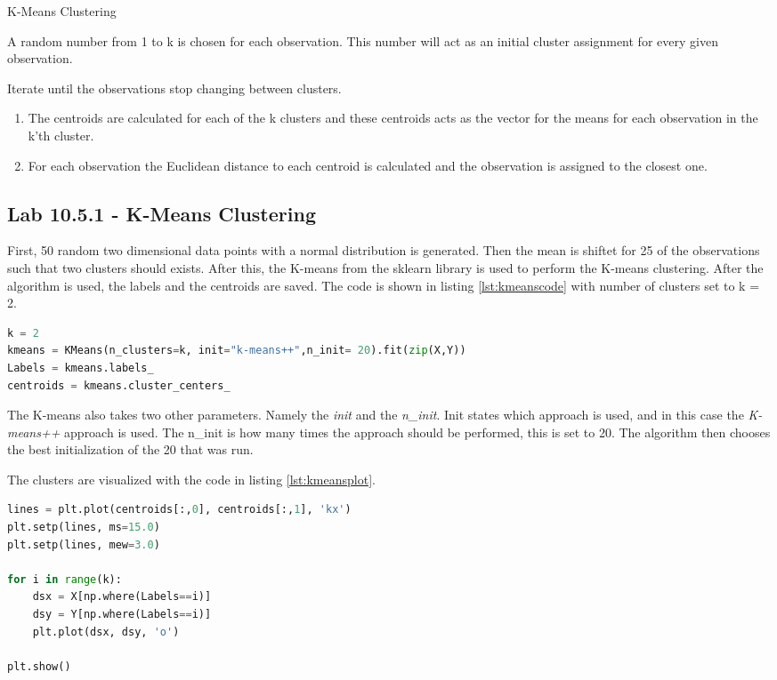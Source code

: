 \begin{algorithm}
	\caption{K-Means Clustering}
	\label{algo:KMeansClustering}
	\begin{algorithmic}[1]
		\State A random number from 1 to k is chosen for each observation. This number will act as an initial cluster assignment for every given observation.
		
		\State 
		Iterate until the observations stop changing between clusters.
		\begin{enumerate}[label=(\alph*)]
			\item The centroids are calculated for each of the k clusters and these centroids acts as the vector for the means for each observation in the k'th cluster.
			
			\item For each observation the Euclidean distance to each centroid is calculated and the observation is assigned to the closest one.
		\end{enumerate}
	\end{algorithmic}
\end{algorithm}

\subsection{Lab 10.5.1 - K-Means Clustering}
First, 50 random two dimensional data points with a normal distribution is generated. Then the mean is shiftet for 25 of the observations such that two clusters should exists. After this, the K-means from the sklearn library is used to perform the K-means clustering.
After the algorithm is used, the labels and the centroids are saved. The code is shown in listing \ref{lst:kmeanscode} with number of clusters set to k = 2.
\begin{lstlisting}[language=Python, label=lst:kmeanscode, caption=The KMeans function]
k = 2
kmeans = KMeans(n_clusters=k, init="k-means++",n_init= 20).fit(zip(X,Y))
Labels = kmeans.labels_
centroids = kmeans.cluster_centers_
\end{lstlisting}

The K-means also takes two other parameters. Namely the \emph{init} and the \emph{n\_init}. Init states which approach is used, and in this case the \emph{K-means++} approach is used. The n\_init is how many times the approach should be performed, this is set to 20. The algorithm then chooses the best initialization of the 20 that was run.

The clusters are visualized with the code in listing \ref{lst:kmeansplot}.
\newpage
\begin{lstlisting}[language=Python, label=lst:kmeansplot, caption=The code for plotting the two clusters]
lines = plt.plot(centroids[:,0], centroids[:,1], 'kx')
plt.setp(lines, ms=15.0)
plt.setp(lines, mew=3.0)

for i in range(k):
	dsx = X[np.where(Labels==i)]
	dsy = Y[np.where(Labels==i)]
	plt.plot(dsx, dsy, 'o')

plt.show()
\end{lstlisting}

